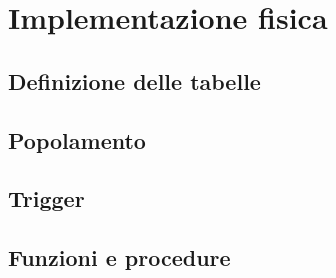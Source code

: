 \section{Implementazione fisica}
\subsection{Definizione delle tabelle}

\subsection{Popolamento}
\subsection{Trigger}
\subsection{Funzioni e procedure}
